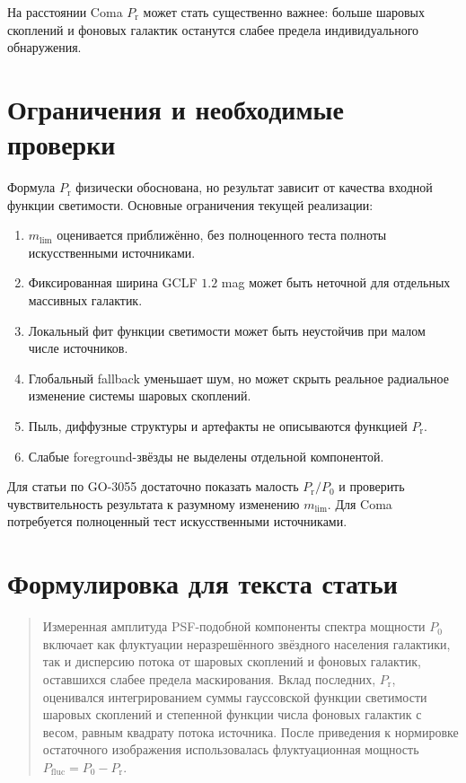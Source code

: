 \documentclass[12pt,a4paper]{article}
\newcommand{\Prpow}{P_{\mathrm r}}
\newcommand{\Pfluc}{P_{\mathrm{fluc}}}
\begin{document}
На расстоянии Coma \(\Prpow\) может стать существенно важнее:
больше шаровых скоплений и фоновых галактик останутся слабее
предела индивидуального обнаружения.

\section{Ограничения и необходимые проверки}

Формула \(\Prpow\) физически обоснована, но результат зависит
от качества входной функции светимости. Основные ограничения
текущей реализации:
\begin{enumerate}
    \item \(m_{\mathrm{lim}}\) оценивается приближённо, без
    полноценного теста полноты искусственными источниками.
    \item Фиксированная ширина GCLF \(1.2\) mag может быть
    неточной для отдельных массивных галактик.
    \item Локальный фит функции светимости может быть
    неустойчив при малом числе источников.
    \item Глобальный fallback уменьшает шум, но может скрыть
    реальное радиальное изменение системы шаровых скоплений.
    \item Пыль, диффузные структуры и артефакты не описываются
    функцией \(\Prpow\).
    \item Слабые foreground-звёзды не выделены отдельной
    компонентой.
\end{enumerate}

Для статьи по GO-3055 достаточно показать малость
\(\Prpow/P_0\) и проверить чувствительность результата к
разумному изменению \(m_{\mathrm{lim}}\). Для Coma потребуется
полноценный тест искусственными источниками.

\section{Формулировка для текста статьи}

\begin{quote}
Измеренная амплитуда PSF-подобной компоненты спектра мощности
\(P_0\) включает как флуктуации неразрешённого звёздного
населения галактики, так и дисперсию потока от шаровых
скоплений и фоновых галактик, оставшихся слабее предела
маскирования. Вклад последних, \(\Prpow\), оценивался
интегрированием суммы гауссовской функции светимости шаровых
скоплений и степенной функции числа фоновых галактик с весом,
равным квадрату потока источника. После приведения к
нормировке остаточного изображения использовалась
флуктуационная мощность
\(\Pfluc=P_0-\Prpow\).
\end{quote}
\end{document}
